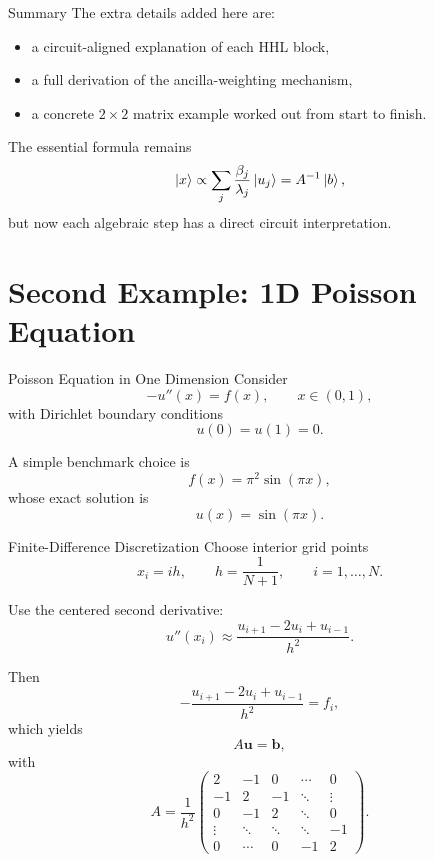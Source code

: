 \documentclass{beamer}
\begin{document}
\begin{frame}{Summary}
The extra details added here are:
\begin{itemize}
    \item a circuit-aligned explanation of each HHL block,
    \item a full derivation of the ancilla-weighting mechanism,
    \item a concrete \(2\times 2\) matrix example worked out from start to finish.
\end{itemize}

The essential formula remains
\[
\ket{x}\propto \sum_j \frac{\beta_j}{\lambda_j}\ket{u_j}=A^{-1}\ket{b},
\]
but now each algebraic step has a direct circuit interpretation.
\end{frame}


\section{Second Example: 1D Poisson Equation}





\begin{frame}{Poisson Equation in One Dimension}
Consider
\[
- u''(x)=f(x),
\qquad
x\in(0,1),
\]
with Dirichlet boundary conditions
\[
u(0)=u(1)=0.
\]

A simple benchmark choice is
\[
f(x)=\pi^2 \sin(\pi x),
\]
whose exact solution is
\[
u(x)=\sin(\pi x).
\]
\end{frame}

\begin{frame}{Finite-Difference Discretization}
Choose interior grid points
\[
x_i = ih,
\qquad
h=\frac{1}{N+1},
\qquad
i=1,\dots,N.
\]

Use the centered second derivative:
\[
u''(x_i)\approx \frac{u_{i+1}-2u_i+u_{i-1}}{h^2}.
\]

Then
\[
-\frac{u_{i+1}-2u_i+u_{i-1}}{h^2}=f_i,
\]
which yields
\[
A\bm{u}=\bm{b},
\]
with
\[
A=\frac{1}{h^2}
\begin{pmatrix}
2 & -1 & 0 & \cdots & 0\\
-1 & 2 & -1 & \ddots & \vdots\\
0 & -1 & 2 & \ddots & 0\\
\vdots & \ddots & \ddots & \ddots & -1\\
0 & \cdots & 0 & -1 & 2
\end{pmatrix}.
\]
\end{frame}
\end{document}
